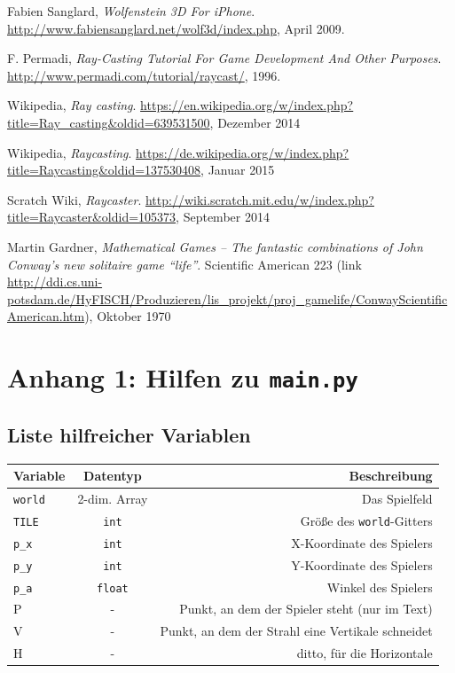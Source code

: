 \documentclass[a4paper,12pt]{report}
\begin{document}
\begin{thebibliography}{9}

  Fabien Sanglard,
  \emph{Wolfenstein 3D For iPhone}.
  \url{http://www.fabiensanglard.net/wolf3d/index.php},
  April 2009.

  F. Permadi,
  \emph{Ray-Casting Tutorial For Game Development And Other Purposes}.
  \url{http://www.permadi.com/tutorial/raycast/},
  1996.

  Wikipedia,
  \emph{Ray casting}.
  \url{https://en.wikipedia.org/w/index.php?title=Ray_casting&oldid=639531500},
  Dezember 2014

  Wikipedia,
  \emph{Raycasting}.
  \url{https://de.wikipedia.org/w/index.php?title=Raycasting&oldid=137530408},
  Januar 2015

  Scratch Wiki,
  \emph{Raycaster}.
  \url{http://wiki.scratch.mit.edu/w/index.php?title=Raycaster&oldid=105373},
  September 2014
  
  Martin Gardner,
  \emph{ Mathematical Games – The fantastic combinations of John Conway's new solitaire game ``life''}.
  Scientific American 223 (link \url{http://ddi.cs.uni-potsdam.de/HyFISCH/Produzieren/lis_projekt/proj_gamelife/ConwayScientificAmerican.htm}),
  Oktober 1970

\end{thebibliography}

\appendix

\chapter{Anhang 1: Hilfen zu \texttt{main.py}}
\section{Liste hilfreicher Variablen}
\begin{center}
	\begin{tabular}{|l|c|r|}
		\hline
		Variable & Datentyp & Beschreibung \\ \hline
		\hline
		\texttt{world} & 2-dim. Array & Das Spielfeld \\ \hline
		\texttt{TILE} & \texttt{int} & Größe des \texttt{world}-Gitters \\ \hline
		\texttt{p\_x} & \texttt{int} & X-Koordinate des Spielers \\ \hline
		\texttt{p\_y} & \texttt{int} & Y-Koordinate des Spielers \\ \hline
		\texttt{p\_a} & \texttt{float} & Winkel des Spielers \\ \hline
		P & - & Punkt, an dem der Spieler steht (nur im Text) \\ \hline
		V & - & Punkt, an dem der Strahl eine Vertikale schneidet \\ \hline
		H & - & ditto, für die Horizontale \\ \hline
	\end{tabular}
\end{center}
\end{document}
